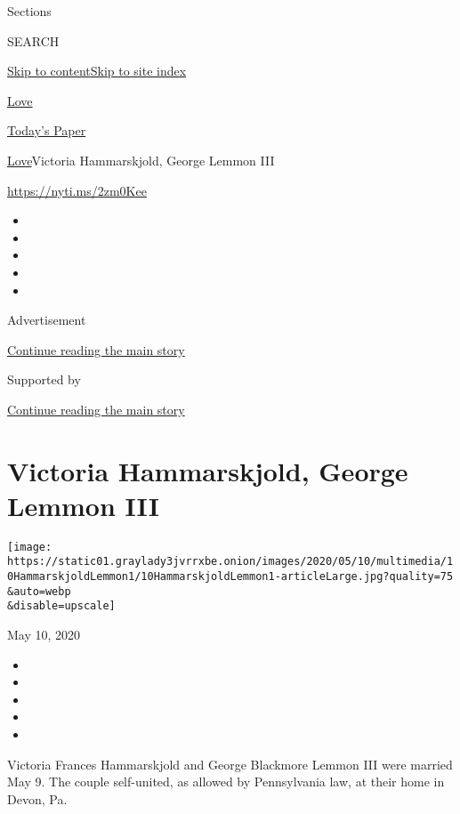 Sections

SEARCH

\protect\hyperlink{site-content}{Skip to
content}\protect\hyperlink{site-index}{Skip to site index}

\href{https://www.nytimes3xbfgragh.onion/section/fashion/weddings}{Love}

\href{https://myaccount.nytimes3xbfgragh.onion/auth/login?response_type=cookie\&client_id=vi}{}

\href{https://www.nytimes3xbfgragh.onion/section/todayspaper}{Today's
Paper}

\href{/section/fashion/weddings}{Love}\textbar{}Victoria Hammarskjold,
George Lemmon III

\href{https://nyti.ms/2zm0Kee}{https://nyti.ms/2zm0Kee}

\begin{itemize}
\item
\item
\item
\item
\item
\end{itemize}

Advertisement

\protect\hyperlink{after-top}{Continue reading the main story}

Supported by

\protect\hyperlink{after-sponsor}{Continue reading the main story}

\hypertarget{victoria-hammarskjold-george-lemmon-iii}{%
\section{Victoria Hammarskjold, George Lemmon
III}\label{victoria-hammarskjold-george-lemmon-iii}}

\texttt{[image: https://static01.graylady3jvrrxbe.onion/images/2020/05/10/multimedia/10HammarskjoldLemmon1/10HammarskjoldLemmon1-articleLarge.jpg?quality=75\\\&auto=webp\\\&disable=upscale]}

May 10, 2020

\begin{itemize}
\item
\item
\item
\item
\item
\end{itemize}

Victoria Frances Hammarskjold and George Blackmore Lemmon III were
married May 9. The couple self-united, as allowed by Pennsylvania law,
at their home in Devon, Pa.

